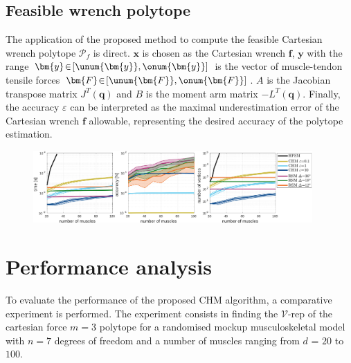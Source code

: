 \subsection{Feasible wrench polytope}
The application of the proposed method to compute the feasible  Cartesian wrench polytope $\mathcal{P}_f$ is direct. $\bm{x}$ is chosen as the Cartesian wrench $\bm{f}$, $\bm{y}$ with the range $\bm{y}\! \in\!\left[\unum{\bm{y}},\onum{\bm{y}}\right]$ is the vector of muscle-tendon tensile forces $\bm{F}\!\in\! \left[\unum{\bm{F}},\onum{\bm{F}}\right]$.  $A$ is the Jacobian transpose matrix $J^T(\bm{q})$ and $B$ is the moment arm matrix $-L^T(\bm{q})$. Finally, the accuracy $\varepsilon$ can be interpreted as the maximal underestimation error of the Cartesian wrench $\bm{f}$ allowable, representing the desired accuracy of the polytope estimation.



\begin{figure}[!t]
    \centering
    \includegraphics[width=0.95\textwidth]{Papers/images/one_auto_new5}
    \vspace{-0.2cm}
    \caption{}
    \label{fig:performance_results}
    \vspace{-0.5cm}
\end{figure}

\section{Performance analysis}

To evaluate the performance of the proposed CHM algorithm, a comparative experiment is performed. The experiment consists in finding the $\mathcal{V}$-rep of the cartesian force $m=3$ polytope for a randomised mockup musculoskeletal model with $n\!=\!7$ degrees of freedom and a number of muscles ranging from $d$ = $20$ to $100$. 

